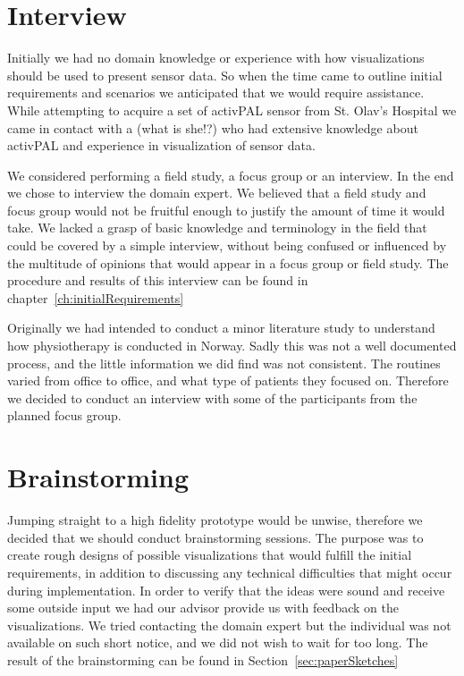 \section{Interview}
Initially we had no domain knowledge or experience with how visualizations should be used to present sensor data. So when the time came to outline initial requirements and scenarios we anticipated that we would require assistance. While attempting to acquire a set of activPAL sensor from St. Olav's Hospital we came in contact with a (what is she!?) who had extensive knowledge about activPAL and experience in visualization of sensor data. 

We considered performing a field study, a focus group or an interview. In the end we chose to interview the domain expert. We believed that a field study and focus group would not be fruitful enough to justify the amount of time it would take. We lacked a grasp of basic knowledge and terminology in the field that could be covered by a simple interview, without being confused or influenced by the multitude of opinions that would appear in a focus group or field study. The procedure and results of this interview can be found in chapter~\ref{ch:initialRequirements} 

Originally we had intended to conduct a minor literature study to understand how physiotherapy is conducted in Norway. Sadly this was not a well documented process, and the little information we did find was not consistent. The routines varied from office to office, and what type of patients they focused on. Therefore we decided to conduct an interview with some of the participants from the planned focus group.
 
\section{Brainstorming}
Jumping straight to a high fidelity prototype would be unwise, therefore we decided that we should conduct brainstorming sessions. The purpose was to create rough designs of possible visualizations that would fulfill the initial requirements, in addition to discussing any technical difficulties that might occur during implementation. In order to verify that the ideas were sound and receive some outside input we had our advisor provide us with feedback on the visualizations. We tried contacting the domain expert but the individual was not available on such short notice, and we did not wish to wait for too long. The result of the brainstorming can be found in Section~\ref{sec:paperSketches}

